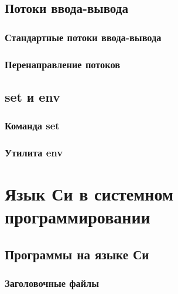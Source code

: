 \documentclass[oneside]{book}
\begin{document}
		\chapter{Потоки ввода-вывода}
		
		
			\section{Стандартные потоки ввода-вывода}
			
			
			\section{Перенаправление потоков}
			
			
		\chapter{set и env}
		
		
			\section{Команда set}
			
		
			\section{Утилита env}
			
			
			
			

\part{Язык Си в системном программировании}
%

	\chapter{Программы на языке Си}
	
	
		\section{Заголовочные файлы}
		
		
\end{document}
